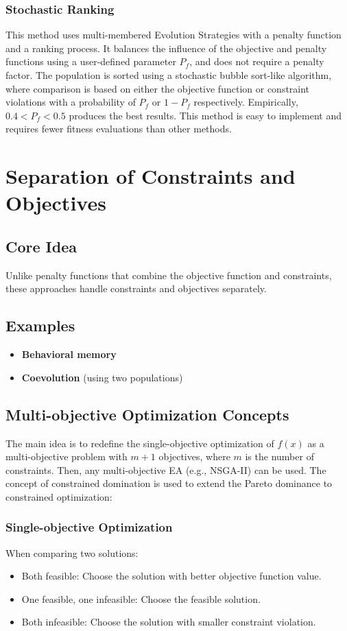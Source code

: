 \subsubsection*{Stochastic Ranking}
This method uses multi-membered Evolution Strategies with a penalty function and a ranking process.  It balances the influence of the objective and penalty functions using a user-defined parameter \(P_f\), and does not require a penalty factor.  The population is sorted using a stochastic bubble sort-like algorithm, where comparison is based on either the objective function or constraint violations with a probability of \(P_f\) or \(1-P_f\) respectively. Empirically, \(0.4 < P_f < 0.5\) produces the best results.  This method is easy to implement and requires fewer fitness evaluations than other methods.

\section{Separation of Constraints and Objectives}

\subsection*{Core Idea}
Unlike penalty functions that combine the objective function and constraints, these approaches handle constraints and objectives separately.

\subsection*{Examples}
\begin{itemize}
    \item \textbf{Behavioral memory}
    \item \textbf{Coevolution} (using two populations)
\end{itemize}

\subsection*{Multi-objective Optimization Concepts}
The main idea is to redefine the single-objective optimization of \(f(x)\) as a multi-objective problem with \(m+1\) objectives, where \(m\) is the number of constraints. Then, any multi-objective EA (e.g., NSGA-II) can be used. The concept of constrained domination is used to extend the Pareto dominance to constrained optimization:

\subsubsection*{Single-objective Optimization}
When comparing two solutions:
\begin{itemize}
    \item Both feasible: Choose the solution with better objective function value.
    \item One feasible, one infeasible: Choose the feasible solution.
    \item Both infeasible: Choose the solution with smaller constraint violation.
\end{itemize}

